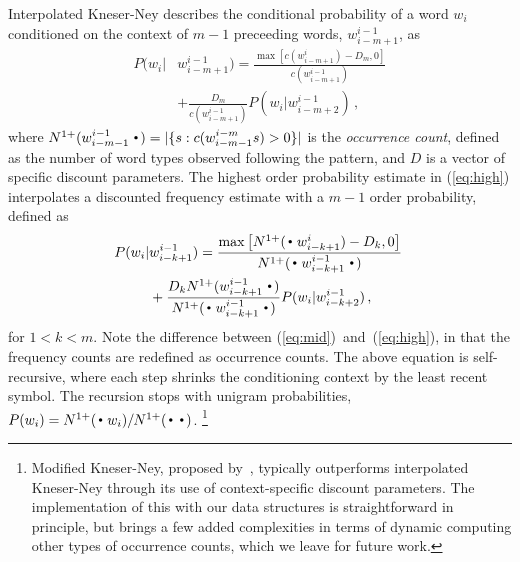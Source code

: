 Interpolated Kneser-Ney describes the conditional probability of a word $w_i$ conditioned on the context of $m-1$ preceeding words, $w_{i-m+1}^{i-1}$, as 
\begin{align}
\! P(w_i |& w_{i-m+1}^{i-1})
 = \frac{\max\left[c(w^{i}_{i-m+1}) - D_m,0\right]}{c(w^{i-1}_{i-m+1})} \nonumber \\
& +\frac{D_m }{c(w^{i-1}_{i-m+1})}  P(w_i | w_{i-m+2}^{i-1}) \, , \label{eq:high}
\end{align}
where \mbox{$\nlplus{w^{i-1}_{i-m-1}\Bigcdot} = |\{s: c(w^{i-m}_{i-m-1}s)>0\}|$} is the \emph{occurrence count}, defined as the number of word types observed following the pattern, and $D$ is a vector of \ngram specific discount parameters.
The highest order probability estimate in (\ref{eq:high}) interpolates a discounted frequency estimate with a $m-1$ order probability, defined as 
\begin{align}
\! P(w_i |& w_{i-k+1}^{i-1})
 = \frac{\max\left[\nlplus{\Bigcdot w_{i-k+1}^{i}} - D_k,0\right]}{\nlplus{\Bigcdot w_{i-k+1}^{i-1} \Bigcdot}} \nonumber \\
&+ \frac{D_k \nlplus{w_{i-k+1}^{i-1}\Bigcdot}}{\nlplus{\Bigcdot w_{i-k+1}^{i-1} \Bigcdot}} P(w_i | w_{i-k+2}^{i-1}) \, , \! \label{eq:mid}
\end{align}
for $1<k<m$. 
Note the difference between (\ref{eq:mid})~and~(\ref{eq:high}), in that the frequency counts are redefined as occurrence counts. 
The above equation is self-recursive, where each step shrinks the conditioning context by the least recent symbol. 
The recursion stops with unigram probabilities,
%
$ P(w_i) = \nlplus{\Bigcdot w_i} / \nlplus{\Bigcdot\Bigcdot}$.%
\footnote{Modified Kneser-Ney, proposed
  by~, typically outperforms interpolated
  Kneser-Ney through its use of context-specific discount parameters.
The implementation of this with our data structures is straightforward in principle, but brings a few added complexities in terms of dynamic computing other types of occurrence counts, which we leave for future work.}


